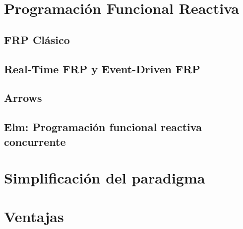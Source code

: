
\section{Programación Funcional Reactiva}



\subsection{FRP Clásico}



\subsection{Real-Time FRP y Event-Driven FRP}


\subsection{Arrows}


\subsection{Elm: Programación funcional reactiva concurrente}

   
\section{Simplificación del paradigma}


\section{Ventajas}


